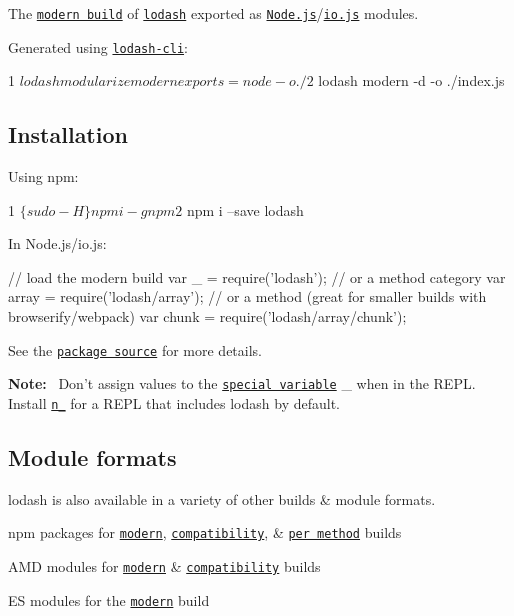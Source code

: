 The \href{https://github.com/lodash/lodash/wiki/Build-Differences}{\tt modern build} of \href{https://lodash.com/}{\tt lodash} exported as \href{http://nodejs.org/}{\tt Node.\+js}/\href{https://iojs.org/}{\tt io.\+js} modules.

Generated using \href{https://www.npmjs.com/package/lodash-cli}{\tt lodash-\/cli}\+: 
\begin{DoxyCode}
1 $ lodash modularize modern exports=node -o ./
2 $ lodash modern -d -o ./index.js
\end{DoxyCode}


\subsection*{Installation}

Using npm\+:


\begin{DoxyCode}
1 $ \{sudo -H\} npm i -g npm
2 $ npm i --save lodash
\end{DoxyCode}


In Node.\+js/io.js\+:


\begin{DoxyCode}
\textcolor{comment}{// load the modern build}
var \_ = require(\textcolor{stringliteral}{'lodash'});
\textcolor{comment}{// or a method category}
var array = require(\textcolor{stringliteral}{'lodash/array'});
\textcolor{comment}{// or a method (great for smaller builds with browserify/webpack)}
var chunk = require(\textcolor{stringliteral}{'lodash/array/chunk'});
\end{DoxyCode}


See the \href{https://github.com/lodash/lodash/tree/3.10.1-npm}{\tt package source} for more details.

{\bfseries Note\+:}~\newline
 Don’t assign values to the \href{http://nodejs.org/api/repl.html#repl_repl_features}{\tt special variable} {\ttfamily \+\_\+} when in the R\+E\+P\+L.~\newline
 Install \href{https://www.npmjs.com/package/n_}{\tt n\+\_\+} for a R\+E\+P\+L that includes lodash by default.

\subsection*{Module formats}

lodash is also available in a variety of other builds \& module formats.


\begin{DoxyItemize}
\item npm packages for \href{https://www.npmjs.com/package/lodash}{\tt modern}, \href{https://www.npmjs.com/package/lodash-compat}{\tt compatibility}, \& \href{https://www.npmjs.com/browse/keyword/lodash-modularized}{\tt per method} builds
\item A\+M\+D modules for \href{https://github.com/lodash/lodash/tree/3.10.1-amd}{\tt modern} \& \href{https://github.com/lodash/lodash-compat/tree/3.10.1-amd}{\tt compatibility} builds
\item E\+S modules for the \href{https://github.com/lodash/lodash/tree/3.10.1-es}{\tt modern} build
\end{DoxyItemize}

